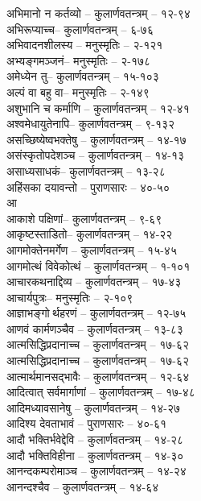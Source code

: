 \begin{raggedright}
\begin{parcolumns}[colwidths={1=.55\textwidth,2=.55\textwidth}]{2}
{अभिमानो न कर्तव्यो	– 	कुलार्णवतन्त्रम्  – १२-९४\\
अभिरूप्याच्च– 	कुलार्णवतन्त्रम्  – ६-७६\\
अभिवादनशीलस्य	– 	मनुस्मृतिः  – २-१२१\\
अभ्यङ्गमञ्जनं– 	मनुस्मृतिः  – २-१७८\\
अमेध्येन तु– 	कुलार्णवतन्त्रम्  – १५-१०३\\
अल्पं वा बहु वा– 	मनुस्मृतिः  – २-१४९\\
अशुभानि च कर्माणि	– 	कुलार्णवतन्त्रम्  – १२-४१\\
अश्वमेधायुतेनापि– 	कुलार्णवतन्त्रम्  – ९-१३२\\
असच्छिष्येष्वभक्तेषु	– 	कुलार्णवतन्त्रम्  – १४-१७\\
असंस्कृतोपदेशञ्च	– 	कुलार्णवतन्त्रम्  – १४-१३\\
असाध्यसाधकं– 	कुलार्णवतन्त्रम्  – १३-२८\\
अहिंसका दयावन्तो	–   पुराणसारः   – ४०-५०\\
{\large आ}\\
आकाशे पक्षिणां– 	कुलार्णवतन्त्रम्  – ९-६९\\
आकृष्टस्ताडितो– 	कुलार्णवतन्त्रम्  – १४-२२\\
आगमोक्तेनमर्गेण	– 	कुलार्णवतन्त्रम्  – १५-४५\\
आगमोत्थं विवेकोत्थं	– 	कुलार्णवतन्त्रम्  – १-१०१\\
आचारकथनाद्दिव्य	– 	कुलार्णवतन्त्रम्  – १७-४३\\
आचार्यपुत्रः– 	मनुस्मृतिः  – २-१०९\\
आज्ञाभङ्गोर्थहरणं	– 	कुलार्णवतन्त्रम्  – १२-७५\\
आणवं कार्मणञ्चैव	– 	कुलार्णवतन्त्रम्  – १३-८३\\
आत्मसिद्धिप्रदानाच्च	– 	कुलार्णवतन्त्रम्  – १७-६२\\
आत्मसिद्धिप्रदानाच्च	– 	कुलार्णवतन्त्रम्  – १७-६२\\
आत्मार्थमानसद्भावैः	– 	कुलार्णवतन्त्रम्  – १२-६४\\
आदित्वात् सर्वमार्गाणां	– 	कुलार्णवतन्त्रम्  – १७-४८\\
आदिमध्यावसानेषु	– 	कुलार्णवतन्त्रम्  – १४-२७\\
आदिश्य देवताभावं	– 	पुराणसारः   – ४०-६१\\
आदौ भक्तिर्भवेद्देवि	– 	कुलार्णवतन्त्रम्  – १४-२८\\
आदौ भक्तिविहीना	– 	कुलार्णवतन्त्रम्  – १४-३०\\
आनन्दकम्परोमाञ्च	– 	कुलार्णवतन्त्रम्  – १४-२४\\
आनन्दश्चैव	– 	कुलार्णवतन्त्रम्  – १४-६४\\
}
\end{parcolumns}
\end{raggedright}
